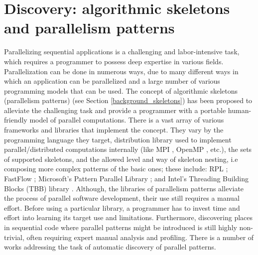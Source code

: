 \section{Discovery: algorithmic skeletons and parallelism patterns}
\label{related_work_as_and_pp}
\quad Parallelizing sequential applications is a challenging and labor-intensive task, which requires a programmer to possess deep expertise in various fields. Parallelization can be done in numerous ways, due to many different ways in which an application can be parallelized and a large number of various programming models that can be used. The concept of algorithmic skeletons (parallelism patterns) (see Section \ref{background_skeletons}) has been proposed to alleviate the challenging task and provide a programmer with a portable human-friendly model of parallel computations. There is a vast array of various frameworks and libraries that implement the concept. They vary by the programming language they target, distribution library used to implement parallel/distributed computations internally (like MPI \cite{mpi}, OpenMP \cite{openmp_specs}, etc.), the sets of supported skeletons, and the allowed level and way of skeleton nesting, i.e composing more complex patterns of the basic ones; these include: RPL \cite{7445342}; FastFlow \cite{fastflow}; Microsoft’s Pattern Parallel Library \cite{microsoft-ppl}; and Intel’s Threading Building Blocks (TBB) library \cite{intel-tbb}.\newline\null
\quad Although, the libraries of parallelism patterns alleviate the process of parallel software development, their use still requires a manual effort. Before using a particular library, a programmer has to invest time and effort into learning its target use and limitations. Furthermore, discovering places in sequential code where parallel patterns might be introduced is
still highly non-trivial, often requiring expert manual analysis and profiling. There is a number of works addressing the task of automatic discovery of parallel patterns.\newline\null

